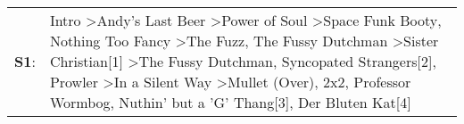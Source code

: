 \begin{supertabular}{p{0.03\textwidth}p{0.92\textwidth}}
 \textbf{S1}:  &  Intro\textsuperscript{} \textgreater \enspace Andy's Last Beer\textsuperscript{} \textgreater \enspace Power of Soul\textsuperscript{} \textgreater \enspace Space Funk Booty\textsuperscript{}, \enspace Nothing Too Fancy\textsuperscript{} \textgreater \enspace The Fuzz\textsuperscript{}, \enspace The Fussy Dutchman\textsuperscript{} \textgreater \enspace Sister Christian[1]\textsuperscript{} \textgreater \enspace The Fussy Dutchman\textsuperscript{}, \enspace Syncopated Strangers[2]\textsuperscript{}, \enspace Prowler\textsuperscript{} \textgreater \enspace In a Silent Way\textsuperscript{} \textgreater \enspace Mullet (Over)\textsuperscript{}, \enspace 2x2\textsuperscript{}, \enspace Professor Wormbog\textsuperscript{}, \enspace Nuthin' but a 'G' Thang[3]\textsuperscript{}, \enspace Der Bluten Kat[4]\textsuperscript{}  \enspace  \\
\end{supertabular}
